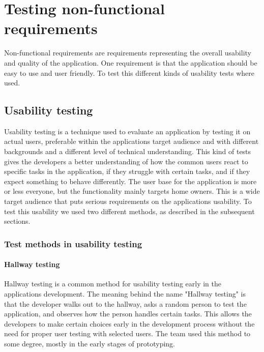 \section{Testing non-functional requirements}
\label{sec:testingnonfunctionalrequirements}
Non-functional requirements are requirements representing the overall usability and quality of the application. One requirement is that the application should be easy to use and user friendly. To test this different kinds of usability tests where used.

\subsection{Usability testing}
\label{sec:userTest}

Usability testing is a technique used to evaluate an application by testing it on actual users, preferable within the applications target audience and with different backgrounds and a different level of technical understanding. This kind of tests gives the developers a better understanding of how the common users react to specific tasks in the application, if they struggle with certain tasks, and if they expect something to behave differently.
The user base for the application is more or less everyone, but the functionality mainly targets home owners. This is a wide target audience that puts serious requirements on the applications usability. To test this usability we used two different methods, as described in the subsequent sections.

\subsubsection{Test methods in usability testing}

\paragraph{Hallway testing}
Hallway testing is a common method for usability testing early in the applications development. The meaning behind the name "Hallway testing" is that the developer walks out to the hallway, asks a random person to test the application, and observes how the person handles certain tasks. This allows the developers to make certain choices early in the development process without the need for proper user testing with selected users. 
The team used this method to some degree, mostly in the early stages of prototyping.

